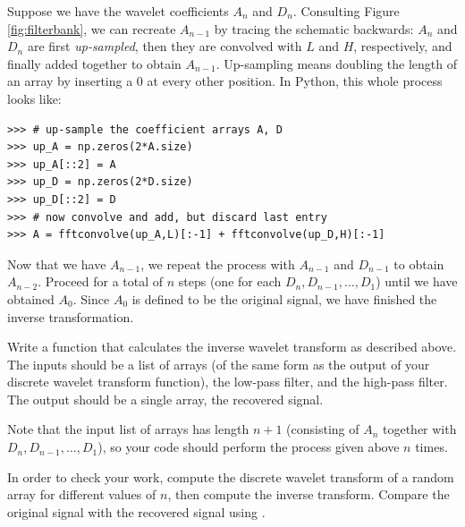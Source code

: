 Suppose we have the wavelet coefficients $A_n$ and $D_n$. Consulting Figure \ref{fig:filterbank},
we can recreate $A_{n-1}$ by tracing the schematic backwards: $A_n$ and $D_n$ are first
\emph{up-sampled}, then they are convolved with $L$ and $H$, respectively, and finally
added together to obtain $A_{n-1}$. Up-sampling means doubling the length of an array
by inserting a 0 at every other position. In Python, this whole process looks like:
\begin{lstlisting}
>>> # up-sample the coefficient arrays A, D
>>> up_A = np.zeros(2*A.size)
>>> up_A[::2] = A
>>> up_D = np.zeros(2*D.size)
>>> up_D[::2] = D
>>> # now convolve and add, but discard last entry
>>> A = fftconvolve(up_A,L)[:-1] + fftconvolve(up_D,H)[:-1]
\end{lstlisting}
Now that we have $A_{n-1}$, we repeat the process with $A_{n-1}$ and $D_{n-1}$ to obtain
$A_{n-2}$. Proceed for a total of $n$ steps (one for each $D_n, D_{n-1},\ldots ,D_1$) until we have obtained $A_0$.
Since $A_0$ is defined to be the original
signal, we have finished the inverse transformation.
\begin{problem}
Write a function that calculates the inverse wavelet transform as described above.
The inputs should be a list of arrays (of the same form as the output of your discrete
wavelet transform function), the low-pass filter, and the high-pass filter.
The output should be a single array, the recovered signal.

Note that the input list of arrays has length $n+1$ (consisting of $A_n$ together with
$D_n, D_{n-1}, \ldots, D_1$), so your code should perform the process given above $n$ times.

In order to check your work, compute
the discrete wavelet transform of a random array for different values of $n$, then compute the inverse
transform.
Compare the original signal with the recovered signal using .
\end{problem}
